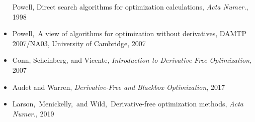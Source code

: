 \documentclass[slidestop,mathserif,xcolor=dvipsnames]{beamer}
\begin{document}
\begin{frame}
\begin{itemize}
        Powell, Direct search algorithms for optimization calculations,  \textit{Acta Numer.}, 1998
\vspace{1ex}
 \item Powell,~A view of algorithms for optimization without derivatives,
DAMTP 2007/NA03, University of Cambridge, 2007
\vspace{1ex}
    \item Conn, Scheinberg, and Vicente, \textit{Introduction to Derivative-Free Optimization}, 2007
\vspace{1ex}
    \item Audet and Warren, \textit{Derivative-Free and Blackbox Optimization}, 2017
\vspace{1ex}
    \item {Larson,~Menickelly,~and Wild,~Derivative-free optimization methods, \textit{Acta Numer.}, 2019}
  \end{itemize}


\end{frame}
\end{document}

